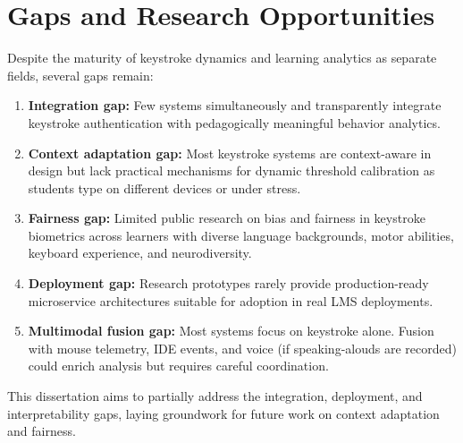 \section{Gaps and Research Opportunities}
\label{sec:research-gaps}

Despite the maturity of keystroke dynamics and learning analytics as separate fields, several gaps remain:

\begin{enumerate}
  \item \textbf{Integration gap:} Few systems simultaneously and transparently integrate keystroke authentication with pedagogically meaningful behavior analytics.
  
  \item \textbf{Context adaptation gap:} Most keystroke systems are context-aware in design but lack practical mechanisms for dynamic threshold calibration as students type on different devices or under stress.
  
  \item \textbf{Fairness gap:} Limited public research on bias and fairness in keystroke biometrics across learners with diverse language backgrounds, motor abilities, keyboard experience, and neurodiversity.
  
  \item \textbf{Deployment gap:} Research prototypes rarely provide production-ready microservice architectures suitable for adoption in real LMS deployments.
  
  \item \textbf{Multimodal fusion gap:} Most systems focus on keystroke alone. Fusion with mouse telemetry, IDE events, and voice (if speaking-alouds are recorded) could enrich analysis but requires careful coordination.
\end{enumerate}

This dissertation aims to partially address the integration, deployment, and interpretability gaps, laying groundwork for future work on context adaptation and fairness.

\clearpage

